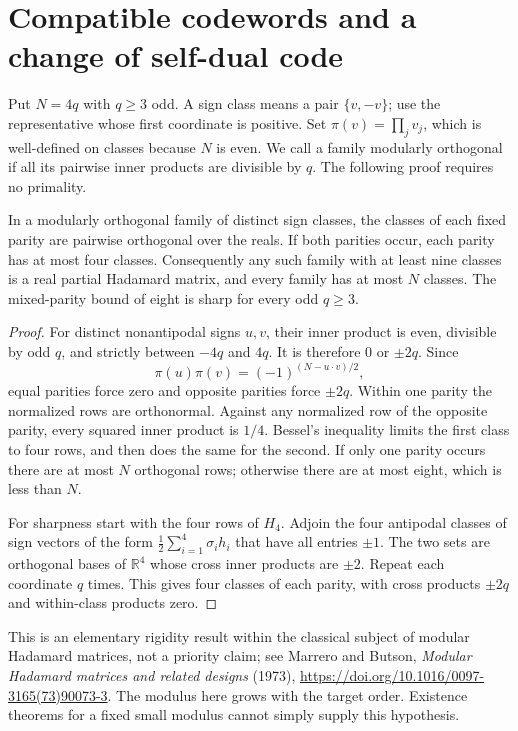 \section{Compatible codewords and a change of self-dual code}
\label{sec:compatible-codes}

Put $N=4q$ with $q\ge3$ odd. A sign class means a pair $\{v,-v\}$;
use the representative whose first coordinate is positive. Set
$\pi(v)=\prod_jv_j$, which is well-defined on classes because $N$ is even.
We call a family modularly orthogonal if all its pairwise inner products
are divisible by $q$. The following proof requires no primality.

\begin{theorem}\label{code:parity}
In a modularly orthogonal family of distinct sign classes, the
classes of each fixed parity are pairwise orthogonal over the reals.
If both parities occur, each parity has at most four classes.
Consequently any such family with at least nine classes is a real
partial Hadamard matrix, and every family has at most $N$ classes.
The mixed-parity bound of eight is sharp for every odd $q\ge3$.
\end{theorem}
\begin{proof}
For distinct nonantipodal signs $u,v$, their inner product is even,
divisible by odd $q$, and strictly between $-4q$ and $4q$. It is
therefore $0$ or $\pm2q$. Since
\[
 \pi(u)\pi(v)=(-1)^{(N-u\cdot v)/2},
\]
equal parities force zero and opposite parities force $\pm2q$.
Within one parity the normalized rows are orthonormal. Against
any normalized row of the opposite parity, every squared inner
product is $1/4$. Bessel's inequality limits the first class to
four rows, and then does the same for the second.
If only one parity occurs there are at most $N$ orthogonal rows;
otherwise there are at most eight, which is less than $N$.

For sharpness start with the four rows of $H_4$. Adjoin the four
antipodal classes of sign vectors of the form
$\frac12\sum_{i=1}^4\sigma_i h_i$ that have all entries $\pm1$.
The two sets are orthogonal bases of $\mathbb R^4$ whose cross
inner products are $\pm2$. Repeat each coordinate $q$ times.
This gives four classes of each parity, with cross products
$\pm2q$ and within-class products zero.
\end{proof}

This is an elementary rigidity result within the classical subject
of modular Hadamard matrices, not a priority claim; see Marrero and
Butson, \emph{Modular Hadamard matrices and related designs} (1973),
\url{https://doi.org/10.1016/0097-3165(73)90073-3}.
The modulus here grows with the target order. Existence theorems
for a fixed small modulus cannot simply supply this hypothesis.

